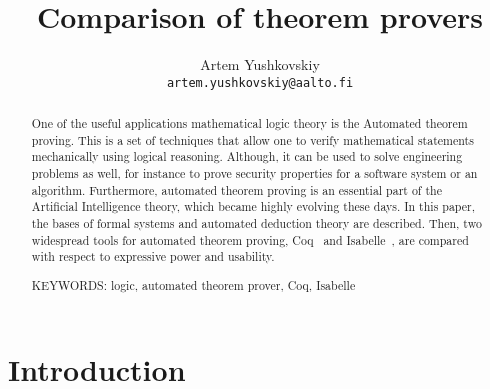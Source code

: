 \documentclass[article]{aaltoseries}
\begin{document}
 

\title{Comparison of theorem provers}

\author{Artem Yushkovskiy
\\\textnormal{\texttt{artem.yushkovskiy@aalto.fi}}}


\maketitle


\begin{abstract}
One of the useful applications mathematical logic theory is the Automated theorem proving. This is a set of techniques that allow one to verify mathematical statements mechanically using logical reasoning. Although, it can be used to solve engineering problems as well, for instance to prove security properties for a software system or an algorithm. Furthermore, automated theorem proving is an essential part of the Artificial Intelligence theory, which became highly evolving these days. In this paper, the bases of formal systems and automated deduction theory are described. Then, two widespread tools for automated theorem proving, Coq~\cite{Coq} and Isabelle~\cite{Isabelle}, are compared with respect to expressive power and usability.

\vspace{3mm}
\noindent KEYWORDS: logic, automated theorem prover, Coq, Isabelle

\end{abstract}




\section{Introduction}
\end{document}
